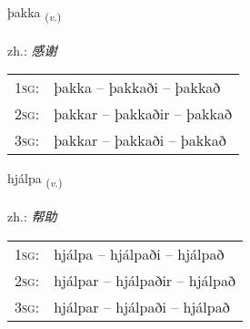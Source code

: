 \documentclass[frontgrid, backgrid]{flacards}\usepackage[]{graphicx}\usepackage[]{xcolor}
\begin{document}
\renewcommand{\flhead}{\vskip5pt \fboxsep=0pt {\small\bfseries\footnotesize Sagnorð | 动词}}
\renewcommand{\fcfoot}{\vskip5pt \fboxsep=0pt \hspace{2pt}{\small\bfseries\footnotesize 1K}}

\renewcommand{\blhead}{\vskip5pt {\small\bfseries\footnotesize Sagnorð | 动词 }}
\renewcommand{\bcfoot}{\vskip5pt \hspace{2pt}{\small\bfseries\footnotesize 1K}}


{þakka \small{\textsubscript{(\textit{v.})}} \\[1ex] %
\textphonetic{[θahka]} \\
zh.: \emph{感谢} \\  [2ex]
\renewcommand*{\arraystretch}{0.8}
\begin{tabular}{p{1cm}l}
\textsc{1sg}: & þakka -- þakkaði -- þakkað \\ 
\textsc{2sg}: & þakkar -- þakkaðir -- þakkað \\ 
\textsc{3sg}: & þakkar -- þakkaði -- þakkað \\ 
\end{tabular}
}

\renewcommand{\flhead}{\vskip5pt \fboxsep=0pt {\small\bfseries\footnotesize Sagnorð | 动词}}
\renewcommand{\fcfoot}{\vskip5pt \fboxsep=0pt \hspace{2pt}{\small\bfseries\footnotesize 1K}}

\renewcommand{\blhead}{\vskip5pt {\small\bfseries\footnotesize Sagnorð | 动词 }}
\renewcommand{\bcfoot}{\vskip5pt \hspace{2pt}{\small\bfseries\footnotesize 1K}}


{hjálpa \small{\textsubscript{(\textit{v.})}} \\[1ex] %
\textphonetic{[çaul̥pa]} \\
zh.: \emph{帮助} \\  [2ex]
\renewcommand*{\arraystretch}{0.8}
\begin{tabular}{p{1cm}l}
\textsc{1sg}: & hjálpa -- hjálpaði -- hjálpað \\ 
\textsc{2sg}: & hjálpar -- hjálpaðir -- hjálpað \\ 
\textsc{3sg}: & hjálpar -- hjálpaði -- hjálpað \\ 
\end{tabular}
}
\end{document}
